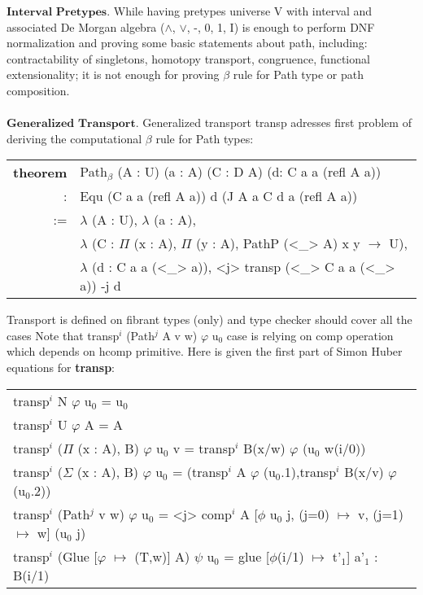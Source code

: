 \documentclass{article}
\theoremstyle{definition}
\newcommand{\tabstyle}[0]{\scriptsize\ttfamily\fontseries{l}\selectfont}
\begin{document}
$\textbf{Interval\ Pretypes}$. While having pretypes universe V with interval and
associated De Morgan algebra ($\wedge$, $\vee$, -, 0, 1, I) is enough to
perform DNF normalization and proving some basic statements about path, including:
contractability of singletons, homotopy transport, congruence, functional
extensionality; it is not enough for proving $\beta$ rule for Path type or path composition.
\\
\\
\indent $\textbf{Generalized\ Transport}$. Generalized transport transp adresses
first problem of deriving the computational $\beta$ rule for Path types:

\begin{table}[ht]
\tabstyle
\begin{tabular}{rl}
\textbf{theorem} & Path$_\beta$ (A : U) (a : A) (C : D A) (d: C a a (refl A a)) \\
               : & Equ (C a a (refl A a)) d (J A a C d a (refl A a)) \\
              := & $\lambda$ (A : U), $\lambda$ (a : A), \\
                 & $\lambda$ (C : $\Pi$ (x : A), $\Pi$ (y : A), PathP (<\_> A) x y $\rightarrow$ U), \\
                 & $\lambda$ (d : C a a (<\_> a)), <j> transp (<\_> C a a (<\_> a)) -j d \\
\end{tabular}
\end{table}

Transport is defined on fibrant types (only) and type checker should cover all the cases
Note that transp$^i$ (Path$^j$ A v w) $\varphi$ u$_0$ case is relying on comp
operation which depends on hcomp primitive. Here is given the first part of Simon Huber equations \cite{Huber} for \textbf{transp}:

\begin{table}[ht]
\tabstyle
\begin{tabular}{l}
transp$^{i}$ N $\varphi$ u$_0$ = u$_0$ \\
transp$^{i}$ U $\varphi$ A = A \\
transp$^{i}$ ($\Pi$ (x : A), B) $\varphi$ u$_0$ v = transp$^i$ B(x/w) $\varphi$ (u$_0$ w(i/0)) \\
transp$^{i}$ ($\Sigma$ (x : A), B) $\varphi$ u$_0$ = (transp$^i$ A $\varphi$ (u$_0$.1),transp$^i$ B(x/v) $\varphi$ (u$_0$.2)) \\
transp$^{i}$ (Path$^j$ v w) $\varphi$ u$_0$ = <j> comp$^i$ A [$\phi$ u$_0$ j, (j=0) $\mapsto$ v, (j=1) $\mapsto$ w] (u$_0$ j) \\
transp$^{i}$ (Glue [$\varphi$ $\mapsto$ (T,w)] A) $\psi$ u$_0$ = glue [$\phi$(i/1) $\mapsto$ t'$_1$] a'$_1$ : B(i/1) \\
\end{tabular}
\end{table}
\end{document}
